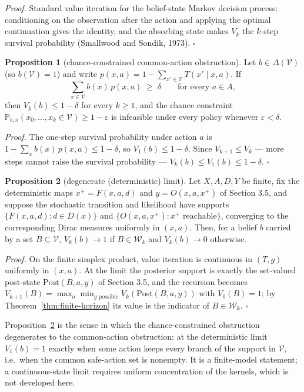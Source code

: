 \documentclass[10pt,twocolumn]{article}
\theoremstyle{definition}
\newtheorem{proposition}{Proposition}
\begin{document}
\emph{Proof.} Standard value iteration for the belief-state Markov decision process: conditioning on the observation after the action and applying the optimal continuation gives the identity, and the absorbing state makes \(V_{k}\) the \(k\)-step survival probability (Smallwood and Sondik, 1973). \hfill\(\square\)

\begin{proposition}[chance-constrained common-action obstruction]\label{prop:chance}
Let \(b \in \Delta(\mathcal{V})\) (so \(b(\mathcal{V}) = 1\)) and write \(p(x,a) = 1 - \sum_{x' \in \mathcal{V}} T(x' \mid x, a)\). If
\[
\sum_{x \in \mathcal{V}} b(x)\, p(x,a) \;\ge\; \delta \qquad \text{for every } a \in A,
\]
then \(V_{k}(b) \le 1 - \delta\) for every \(k \ge 1\), and the chance constraint \(\mathbb{P}_{b,\pi}(x_{0}, \dots, x_{k} \in \mathcal{V}) \ge 1 - \varepsilon\) is infeasible under every policy whenever \(\varepsilon < \delta\).
\end{proposition}

\emph{Proof.} The one-step survival probability under action \(a\) is \(1 - \sum_{x} b(x)\, p(x,a) \le 1 - \delta\), so \(V_{1}(b) \le 1 - \delta\). Since \(V_{k+1} \le V_{k}\) --- more steps cannot raise the survival probability --- \(V_{k}(b) \le V_{1}(b) \le 1 - \delta\). \hfill\(\square\)

\begin{proposition}[degenerate (deterministic) limit]\label{prop:degenerate}
Let \(X, A, D, Y\) be finite, fix the deterministic maps \(x^{+} = F(x,a,d)\) and \(y = O(x,a,x^{+})\) of Section 3.5, and suppose the stochastic transition and likelihood have supports \(\{F(x,a,d) : d \in D(x)\}\) and \(\{O(x,a,x^{+}) : x^{+} \text{ reachable}\}\), converging to the corresponding Dirac measures uniformly in \((x,a)\). Then, for a belief \(b\) carried by a set \(B \subseteq \mathcal{V}\), \(V_{k}(b) \to 1\) if \(B \in \mathcal{W}_{k}\) and \(V_{k}(b) \to 0\) otherwise.
\end{proposition}

\emph{Proof.} On the finite simplex product, value iteration is continuous in \((T, g)\) uniformly in \((x,a)\). At the limit the posterior support is exactly the set-valued post-state \(\mathrm{Post}(B, a, y)\) of Section 3.5, and the recursion becomes \(V_{k+1}(B) = \max_{a} \min_{y \text{ possible}} V_{k}(\mathrm{Post}(B,a,y))\) with \(V_{0}(B) = 1\); by Theorem~\ref{thm:finite-horizon} its value is the indicator of \(B \in \mathcal{W}_{k}\). \hfill\(\square\)

Proposition~\ref{prop:degenerate} is the sense in which the chance-constrained obstruction degenerates to the common-action obstruction: at the deterministic limit \(V_{1}(b) = 1\) exactly when some action keeps every branch of the support in \(\mathcal{V}\), i.e.\ when the common safe-action set is nonempty. It is a finite-model statement; a continuous-state limit requires uniform concentration of the kernels, which is not developed here.
\end{document}
